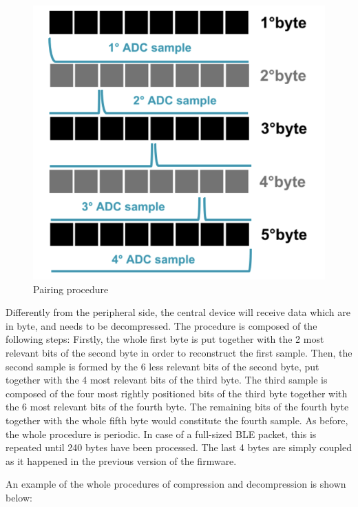 \documentclass{Configuration_Files/PoliMi3i_thesis}
\begin{document}
\begin{figure}[H]
    \centering
    \includegraphics[scale=0.7]{Shift Algorithm/Screenshot 2024-07-22 at 22.31.56.png}
    \caption{Pairing procedure}
    \label{pairing_procedure_6}
\end{figure}

Differently from the peripheral side, the central device will receive data which are in byte, and needs to be decompressed. The procedure is composed of the following steps:
Firstly, the whole first byte is put together with the 2 most relevant bits of the second byte in order to reconstruct the first sample. Then, the second sample is formed by the 6 less relevant bits of the second byte, put together with the 4 most relevant bits of the third byte. The third sample is composed of the four most rightly positioned bits of the third byte together with the 6 most relevant bits of the fourth byte. The remaining bits of the fourth byte together with the whole fifth byte would constitute the fourth sample. As before, the whole procedure is periodic. In case of a full-sized BLE packet, this is repeated until 240 bytes have been processed. The last 4 bytes are simply coupled as it happened in the previous version of the firmware.

An example of the whole procedures of compression and decompression is shown below: 
\end{document}
